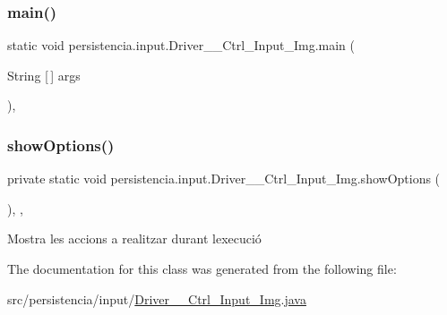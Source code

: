 \subsubsection{\texorpdfstring{main()}{main()}}
{\footnotesize\ttfamily static void persistencia.\+input.\+Driver\+\_\+\+\_\+\+Ctrl\+\_\+\+Input\+\_\+\+Img.\+main (\begin{DoxyParamCaption}\item[{String \mbox{[}$\,$\mbox{]}}]{args }\end{DoxyParamCaption})\hspace{0.3cm}{\ttfamily [inline]}, {\ttfamily [static]}}

\mbox{\label{classpersistencia_1_1input_1_1Driver____Ctrl__Input__Img_a63892d1060c96a4478541bf0feff579d}} 
\subsubsection{\texorpdfstring{show\+Options()}{showOptions()}}
{\footnotesize\ttfamily private static void persistencia.\+input.\+Driver\+\_\+\+\_\+\+Ctrl\+\_\+\+Input\+\_\+\+Img.\+show\+Options (\begin{DoxyParamCaption}{ }\end{DoxyParamCaption})\hspace{0.3cm}{\ttfamily [inline]}, {\ttfamily [static]}, {\ttfamily [private]}}



Mostra les accions a realitzar durant l\textquotesingle{}execució 



The documentation for this class was generated from the following file\+:\begin{DoxyCompactItemize}
\item 
src/persistencia/input/\hyperlink{Driver____Ctrl__Input__Img_8java}{Driver\+\_\+\+\_\+\+Ctrl\+\_\+\+Input\+\_\+\+Img.\+java}\end{DoxyCompactItemize}

